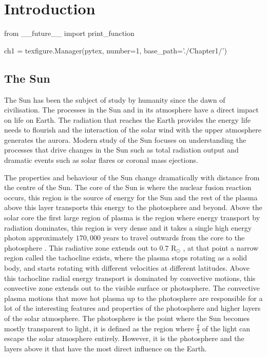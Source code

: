 \label{ch:Intro}
\chapter{Introduction}  %

\begin{pycode}[chapter1]
from __future__ import print_function

ch1 = texfigure.Manager(pytex, number=1, base_path='./Chapter1/')
\end{pycode}

\section{The Sun} %
The Sun has been the subject of study by humanity since the dawn of civilisation.
The processes in the Sun and in its atmosphere have a direct impact on life on Earth.
The radiation that reaches the Earth provides the energy life needs to flourish and the interaction of the solar wind with the upper atmosphere generates the aurora.
Modern study of the Sun focuses on understanding the processes that drive changes in the Sun such as total radiation output and dramatic events such as solar flares or coronal mass ejections.

The properties and behaviour of the Sun change dramatically with distance from the centre of the Sun.
The core of the Sun is where the nuclear fusion reaction occurs, this region is the source of energy for the Sun and the rest of the plasma above this layer transports this energy to the photosphere and beyond.
Above the solar core the first large region of plasma is the region where energy transport by radiation dominates, this region is very dense and it takes a single high energy photon approximately $170,000$ years to travel outwards from the core to the photosphere \citep{priest2014}.
This radiative zone extends out to $0.7$ R$_\odot$ \citep{priest2014}, at that point a narrow region called the tachocline exists, where the plasma stops rotating as a solid body, and starts rotating with different velocities at different latitudes.
Above this tachocline radial energy transport is dominated by convective motions, this convective zone extends out to the visible surface or photosphere.
The convective plasma motions that move hot plasma up to the photosphere are responsible for a lot of the interesting features and properties of the photosphere and higher layers of the solar atmosphere.
The photosphere is the point where the Sun becomes mostly transparent to light, it is defined as the region where $\frac{2}{3}$ of the light can escape the solar atmosphere entirely.
However, it is the photosphere and the layers above it that have the most direct influence on the Earth.

